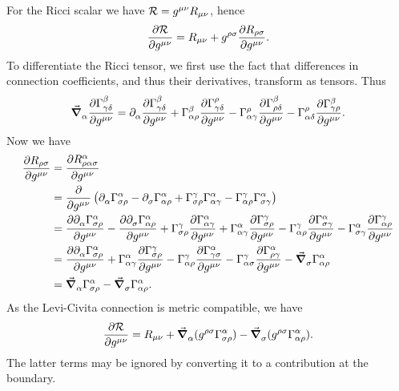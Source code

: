 For the Ricci scalar we have $\mathcal{R} = g^{\mu\nu}R_{\mu\nu}$, hence
\begin{align*}
	\pdv{\ensuremath{\mathcal{R}}}{g^{\mu\nu}} = R_{\mu\nu} + g^{\rho\sigma}\pdv{R_{\rho\sigma}}{g^{\mu\nu}}.
\end{align*}
To differentiate the Ricci tensor, we first use the fact that differences in connection coefficients, and thus their derivatives, transform as tensors. Thus
\begin{align*}
	\dcov{\alpha}{\pdv{\chris{\beta}{\gamma}{\delta}}{g^{\mu\nu}}} = \del{\alpha}{\pdv{\chris{\beta}{\gamma}{\delta}}{g^{\mu\nu}}} + \chris{\beta}{\alpha}{\rho}\pdv{\chris{\rho}{\gamma}{\delta}}{g^{\mu\nu}} - \chris{\rho}{\alpha}{\gamma}\pdv{\chris{\beta}{\rho}{\delta}}{g^{\mu\nu}} - \chris{\rho}{\alpha}{\delta}\pdv{\chris{\beta}{\gamma}{\rho}}{g^{\mu\nu}}.
\end{align*}
Now we have
\begin{align*}
	\pdv{R_{\rho\sigma}}{g^{\mu\nu}} &= \pdv{R^{\alpha}_{\rho\alpha\sigma}}{g^{\mu\nu}} \\
	                                 &= \pdv{g^{\mu\nu}}\left(\del{\alpha}{\chris{\alpha}{\sigma}{\rho}} - \del{\sigma}{\chris{\alpha}{\alpha}{\rho}} + \chris{\gamma}{\sigma}{\rho}\chris{\alpha}{\alpha}{\gamma} - \chris{\gamma}{\alpha}{\rho}\chris{\alpha}{\sigma}{\gamma}\right) \\
	                                 &= \pdv{\del{\alpha}{\chris{\alpha}{\sigma}{\rho}}}{g^{\mu\nu}} - \pdv{\del{\sigma}{\chris{\alpha}{\alpha}{\rho}}}{g^{\mu\nu}} + \chris{\gamma}{\sigma}{\rho}\pdv{\chris{\alpha}{\alpha}{\gamma}}{g^{\mu\nu}} + \chris{\alpha}{\alpha}{\gamma}\pdv{\chris{\gamma}{\sigma}{\rho}}{g^{\mu\nu}} - \chris{\gamma}{\alpha}{\rho}\pdv{\chris{\alpha}{\sigma}{\gamma}}{g^{\mu\nu}} - \chris{\alpha}{\sigma}{\gamma}\pdv{\chris{\gamma}{\alpha}{\rho}}{g^{\mu\nu}} \\
	                                 &= \pdv{\del{\alpha}{\chris{\alpha}{\sigma}{\rho}}}{g^{\mu\nu}} + \chris{\alpha}{\alpha}{\gamma}\pdv{\chris{\gamma}{\sigma}{\rho}}{g^{\mu\nu}} - \chris{\gamma}{\alpha}{\rho}\pdv{\chris{\alpha}{\gamma}{\sigma}}{g^{\mu\nu}} - \chris{\gamma}{\alpha}{\sigma}\pdv{\chris{\alpha}{\rho}{\gamma}}{g^{\mu\nu}} - \dcov{\sigma}{\chris{\alpha}{\alpha}{\rho}} \\
	                                 &= \dcov{\alpha}{\chris{\alpha}{\sigma}{\rho}} - \dcov{\sigma}{\chris{\alpha}{\alpha}{\rho}}.
\end{align*}
As the Levi-Civita connection is metric compatible, we have
\begin{align*}
	\pdv{\R}{g^{\mu\nu}} = R_{\mu\nu} + \dcov{\alpha}{(g^{\rho\sigma}\chris{\alpha}{\sigma}{\rho})} - \dcov{\sigma}{(g^{\rho\sigma}\chris{\alpha}{\alpha}{\rho})}.
\end{align*}
The latter terms may be ignored by converting it to a contribution at the boundary.

